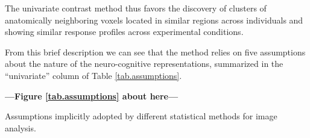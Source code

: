 The univariate contrast method thus favors the discovery of clusters of anatomically neighboring voxels located in similar regions across individuals and showing similar response profiles across experimental conditions. 

From this brief description we can see that the method relies on five assumptions about the nature of the neuro-cognitive representations, summarized in the ``univariate'' column of Table \ref{tab.assumptions}.

\begin{center}
	\textbf{---Figure \ref{tab.assumptions} about here---}
\end{center}

\begin{table}
	
	\caption{Assumptions implicitly adopted by different statistical methods for image analysis.}
	\label{tab.assumptions}
\end{table}

%
%
%
%
%
%
%

